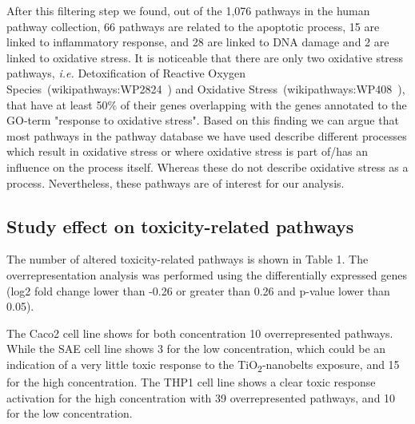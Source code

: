 \documentclass[ijms,article,submit,moreauthors,pdftex]{Definitions/mdpi}
\begin{document}
After this filtering step we found, out of the 1,076 pathways in the human pathway collection, 66 pathways are related to the apoptotic process, 15 are linked to inflammatory response, and 28 are linked to DNA damage and 2 are linked to oxidative stress.
It is noticeable that there are only two oxidative stress pathways, \textit{i.e.} Detoxification of Reactive Oxygen Species~(wikipathways:WP2824~\cite{WP2824}) and Oxidative Stress~(wikipathways:WP408~\cite{WP408}), that have at least 50$\%$ of their genes overlapping with the genes annotated to the GO-term "response to oxidative stress". Based on this finding we can argue that most pathways in the pathway database we have used describe different processes which result in oxidative stress or where oxidative stress is part of/has an influence on the process itself. Whereas these do not describe oxidative stress as a process.  Nevertheless, these pathways are of interest for our analysis. 

\subsection*{Study effect on toxicity-related pathways}
The number of altered toxicity-related pathways is shown in Table 1. The overrepresentation analysis was performed using the differentially expressed genes (log2 fold change lower than -0.26 or greater than 0.26 and p-value lower than 0.05). 

The Caco2 cell line shows for both concentration 10 overrepresented pathways. While the SAE cell line shows 3 for the low concentration, which could be an indication of a very little toxic response to the TiO\textsubscript{2}-nanobelts exposure, and 15 for the high concentration. The THP1 cell line shows a clear toxic response activation for the high concentration with 39 overrepresented pathways, and 10 for the low concentration.
\end{document}

